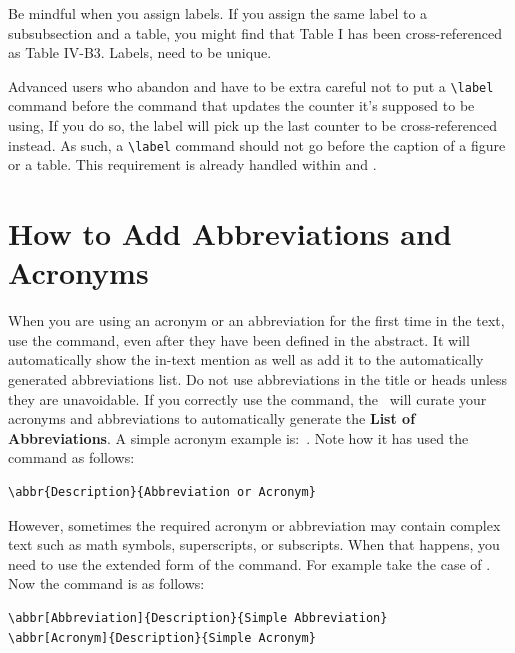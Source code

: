 \documentclass[12pt]{uomthesis}
\begin{document}
Be mindful when you assign labels. If you assign the same label to a
subsubsection and a table, you might find that Table I has been cross-referenced as Table IV-B3. Labels, need to be unique.

Advanced users who abandon  and  have to be extra careful not to put a \verb|\label| command before the command that updates the counter it's supposed to be using, If you do so, the label will pick up the last counter to be cross-referenced instead. As such, a \verb|\label| command should not go before the caption of a figure or a table. This requirement is already handled within  and . 


\section{How to Add Abbreviations and Acronyms}
\label{sec:Latex:AA}
When you are using an acronym or an abbreviation for the first time in the text, use the  command, even after they have been defined in the abstract. It will automatically show the in-text mention as well as add it to the automatically generated abbreviations list. Do not use abbreviations in the title or heads unless they are unavoidable. If you correctly use the  command, the~\TheClass{} will curate your acronyms and abbreviations to automatically generate the \textbf{List of Abbreviations}. A simple acronym example is:~. Note how it has used the  command as follows:

\begin{indentedQuote}
\begin{verbatim}
\abbr{Description}{Abbreviation or Acronym}
\end{verbatim}
\end{indentedQuote}

However, sometimes the required acronym or abbreviation may contain complex text such as math symbols, superscripts, or subscripts. When that happens, you need to use the extended form of the  command. For example take the case of . Now the  command is as follows:

\begin{indentedQuote}
\begin{verbatim}
\abbr[Abbreviation]{Description}{Simple Abbreviation}
\abbr[Acronym]{Description}{Simple Acronym}
\end{verbatim}
\end{indentedQuote}
\end{document}
